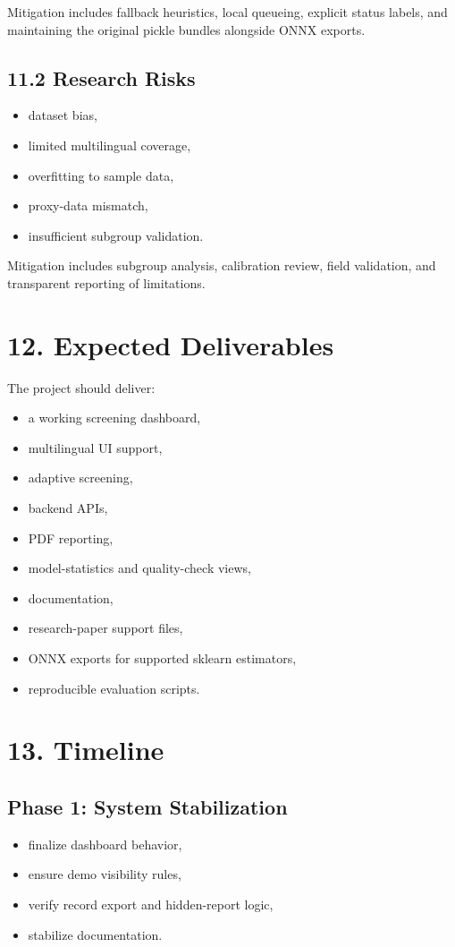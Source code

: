 \documentclass[11pt]{article}
\begin{document}
Mitigation includes fallback heuristics, local queueing, explicit status labels, and maintaining the original pickle bundles alongside ONNX exports.

\subsection{11.2 Research Risks}
\begin{itemize}[leftmargin=*]
  \item dataset bias,
  \item limited multilingual coverage,
  \item overfitting to sample data,
  \item proxy-data mismatch,
  \item insufficient subgroup validation.
\end{itemize}

Mitigation includes subgroup analysis, calibration review, field validation, and transparent reporting of limitations.

\section{12. Expected Deliverables}
The project should deliver:
\begin{itemize}[leftmargin=*]
  \item a working screening dashboard,
  \item multilingual UI support,
  \item adaptive screening,
  \item backend APIs,
  \item PDF reporting,
  \item model-statistics and quality-check views,
  \item documentation,
  \item research-paper support files,
  \item ONNX exports for supported sklearn estimators,
  \item reproducible evaluation scripts.
\end{itemize}

\section{13. Timeline}
\subsection{Phase 1: System Stabilization}
\begin{itemize}[leftmargin=*]
  \item finalize dashboard behavior,
  \item ensure demo visibility rules,
  \item verify record export and hidden-report logic,
  \item stabilize documentation.
\end{itemize}
\end{document}
